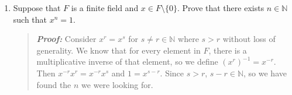 \documentclass{hw}
\newcommand{\NN}{\mathbb{N}}
\begin{document}
\begin{enumerate}
\item Suppose that $F$ is a finite field and $x\in F\setminus\{0\}$. Prove that there exists $n\in\NN$ such that $x^{n}=1$.
\begin{quote}
\textit{\textbf{Proof:}} Consider $x^{r}=x^{s}$ for $s\neq r\in\NN$ where $s>r$ without loss of generality. We know that for every element in $F$, there is a multiplicative inverse of that element, so we define $(x^{r})^{-1}=x^{-r}$. Then $x^{-r}x^{r}=x^{-r}x^{s}$ and $1=x^{s-r}$. Since $s>r$, $s-r\in\NN$, so we have found the $n$ we were looking for.
\end{quote}
\end{enumerate}
\end{document}
